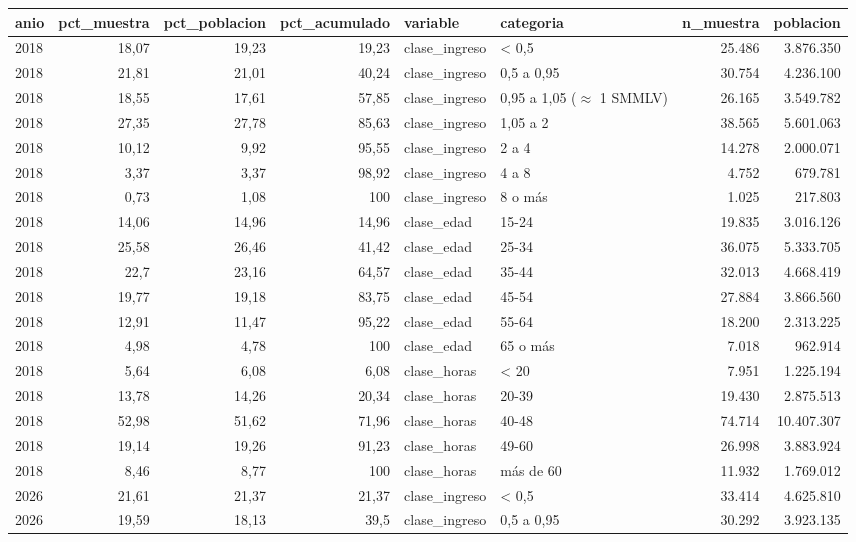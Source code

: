 \begin{tabular}{lrrrllrr}
\toprule
anio & pct\_muestra & pct\_poblacion & pct\_acumulado & variable & categoria & n\_muestra & poblacion \\
\midrule
2018 & 18,07 & 19,23 & 19,23 & clase\_ingreso & < 0,5 & 25.486 & 3.876.350 \\
2018 & 21,81 & 21,01 & 40,24 & clase\_ingreso & 0,5 a 0,95 & 30.754 & 4.236.100 \\
2018 & 18,55 & 17,61 & 57,85 & clase\_ingreso & 0,95 a 1,05 ($\approx$ 1 SMMLV) & 26.165 & 3.549.782 \\
2018 & 27,35 & 27,78 & 85,63 & clase\_ingreso & 1,05 a 2 & 38.565 & 5.601.063 \\
2018 & 10,12 & 9,92 & 95,55 & clase\_ingreso & 2 a 4 & 14.278 & 2.000.071 \\
2018 & 3,37 & 3,37 & 98,92 & clase\_ingreso & 4 a 8 & 4.752 & 679.781 \\
2018 & 0,73 & 1,08 & 100 & clase\_ingreso & 8 o más & 1.025 & 217.803 \\
2018 & 14,06 & 14,96 & 14,96 & clase\_edad & 15-24 & 19.835 & 3.016.126 \\
2018 & 25,58 & 26,46 & 41,42 & clase\_edad & 25-34 & 36.075 & 5.333.705 \\
2018 & 22,7 & 23,16 & 64,57 & clase\_edad & 35-44 & 32.013 & 4.668.419 \\
2018 & 19,77 & 19,18 & 83,75 & clase\_edad & 45-54 & 27.884 & 3.866.560 \\
2018 & 12,91 & 11,47 & 95,22 & clase\_edad & 55-64 & 18.200 & 2.313.225 \\
2018 & 4,98 & 4,78 & 100 & clase\_edad & 65 o más & 7.018 & 962.914 \\
2018 & 5,64 & 6,08 & 6,08 & clase\_horas & < 20 & 7.951 & 1.225.194 \\
2018 & 13,78 & 14,26 & 20,34 & clase\_horas & 20-39 & 19.430 & 2.875.513 \\
2018 & 52,98 & 51,62 & 71,96 & clase\_horas & 40-48 & 74.714 & 10.407.307 \\
2018 & 19,14 & 19,26 & 91,23 & clase\_horas & 49-60 & 26.998 & 3.883.924 \\
2018 & 8,46 & 8,77 & 100 & clase\_horas & más de 60 & 11.932 & 1.769.012 \\
2026 & 21,61 & 21,37 & 21,37 & clase\_ingreso & < 0,5 & 33.414 & 4.625.810 \\
2026 & 19,59 & 18,13 & 39,5 & clase\_ingreso & 0,5 a 0,95 & 30.292 & 3.923.135 \\

\end{tabular}
